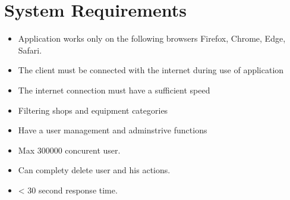 \section{System Requirements}

\begin{itemize}
\item Application works only on the following browsers {Firefox, Chrome, Edge, Safari}.
\item The client must be connected with the internet during use of application
\item The internet connection must have a sufficient speed
\item Filtering shops and equipment categories
\item Have a user management and adminstrive functions
\item Max 300000 concurent user.
\item Can complety delete user and his actions.
\item < 30 second response time.
\end{itemize}